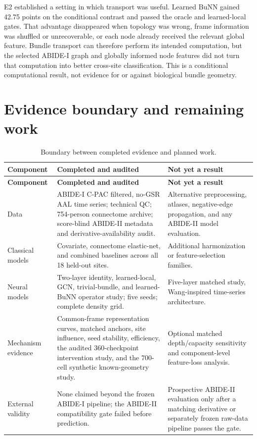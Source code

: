 \documentclass[11pt,a4paper]{article}
\begin{document}
E2 established a setting in which transport was useful. Learned BuNN gained
42.75 points on the conditional contrast and passed the oracle and
learned-local gates. That advantage disappeared when topology was wrong, frame
information was shuffled or unrecoverable, or each node already received the
relevant global feature. Bundle transport can therefore perform its intended
computation, but the selected ABIDE-I graph and globally informed node features
did not turn that computation into better cross-site classification. This is a
conditional computational result, not evidence for or against biological
bundle geometry.

\appendix
\section{Evidence boundary and remaining work}

\begin{longtable}{@{}p{3.2cm}p{5.6cm}p{5.5cm}@{}}
\caption{Boundary between completed evidence and planned work.}\label{tab:status}\\
\toprule
\textbf{Component} & \textbf{Completed and audited} & \textbf{Not yet a result} \\
\midrule
\endfirsthead
\toprule
\textbf{Component} & \textbf{Completed and audited} & \textbf{Not yet a result} \\
\midrule
\endhead
Data & ABIDE-I C-PAC filtered, no-GSR AAL time series; technical QC; 754-person connectome archive; score-blind ABIDE-II metadata and derivative-availability audit. & Alternative preprocessing, atlases, negative-edge propagation, and any ABIDE-II model evaluation. \\
Classical models & Covariate, connectome elastic-net, and combined baselines across all 18 held-out sites. & Additional harmonization or feature-selection families. \\
Neural models & Two-layer identity, learned-local, GCN, trivial-bundle, and learned-BuNN operator study; five seeds; complete density grid. & Five-layer matched study, Wang-inspired time-series architecture. \\
Mechanism evidence & Common-frame representation curves, matched anchors, site influence, seed stability, efficiency, the audited 360-checkpoint intervention study, and the 700-cell synthetic known-geometry study. & Optional matched depth/capacity sensitivity and component-level feature-loss analysis. \\
External validity & None claimed beyond the frozen ABIDE-I pipeline; the ABIDE-II compatibility gate failed before prediction. & Prospective ABIDE-II evaluation only after a matching derivative or separately frozen raw-data pipeline passes the gate. \\
\bottomrule
\end{longtable}
\end{document}
